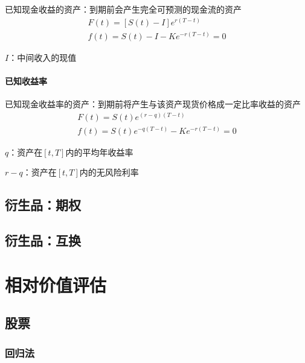 \documentclass[12pt]{book}
\begin{document}
已知现金收益的资产：到期前会产生完全可预测的现金流的资产
\begin{gather*}
  F\left(t\right)=\left[S\left(t\right)-I\right]e^{r\left(T-t\right)}\\
  f\left(t\right)=S\left(t\right)-I-Ke^{-r\left(T-t\right)}=0
\end{gather*}
\par $I$：中间收入的现值

\paragraph{已知收益率}	

已知现金收益率的资产：到期前将产生与该资产现货价格成一定比率收益的资产
\begin{gather*}
  F\left(t\right)=S\left(t\right)e^{\left(r-q\right)\left(T-t\right)}\\
  f\left(t\right)=S\left(t\right)e^{-q\left(T-t\right)}-Ke^{-r\left(T-t\right)}=0
\end{gather*}
\par $q$：资产在$\left[t,T\right]$内的平均年收益率
\par $r-q$：资产在$\left[t,T\right]$内的无风险利率





\subsection{衍生品：期权}


\subsection{衍生品：互换}


\section{相对价值评估}



\subsection{股票}





\subsubsection{回归法}
\end{document}

